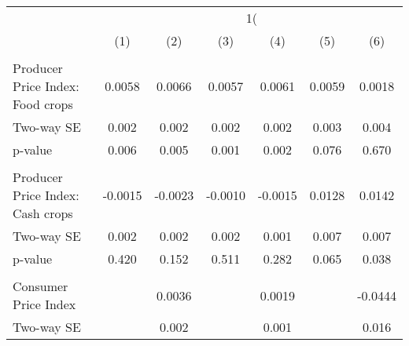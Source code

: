 {
\def\sym#1{\ifmmode^{#1}\else\(^{#1}\)\fi}
\begin{tabular}{l*{6}{c}}
\hline\hline
                    &&&\\\cmidrule(lr){2-3}\cmidrule(lr){4-5}\cmidrule(lr){6-7}
                    &         &         &         &         &         &         \\
\hline
\hline
\\ Producer Price Index: Food crops&      0.0058         &      0.0066         &      0.0057         &      0.0061         &      0.0059         &      0.0018         \\
\hspace{15pt} Two-way SE&       0.002         &       0.002         &       0.002         &       0.002         &       0.003         &       0.004         \\
\hspace{25pt} p-value&       0.006         &       0.005         &       0.001         &       0.002         &       0.076         &       0.670         \\
\\ Producer Price Index: Cash crops&     -0.0015         &     -0.0023         &     -0.0010         &     -0.0015         &      0.0128         &      0.0142         \\
\hspace{15pt} Two-way SE&       0.002         &       0.002         &       0.002         &       0.001         &       0.007         &       0.007         \\
\hspace{25pt} p-value&       0.420         &       0.152         &       0.511         &       0.282         &       0.065         &       0.038         \\
\\ Consumer Price Index&                     &      0.0036         &                     &      0.0019         &                     &     -0.0444         \\
\hspace{15pt} Two-way SE&                     &       0.002         &                     &       0.001         &                     &       0.016         \\

\end{tabular}}
